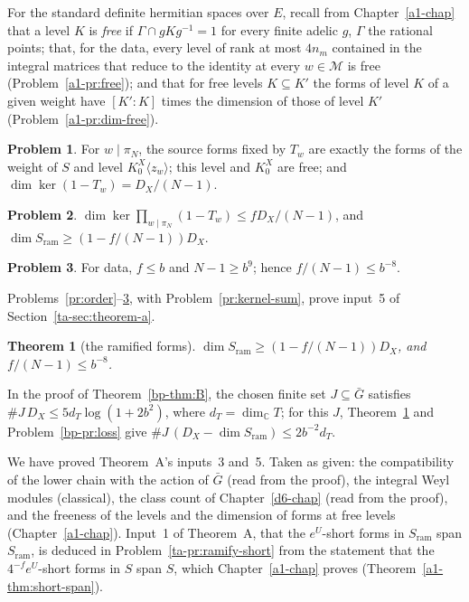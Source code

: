 \documentclass[reqno]{amsart}
\newcounter{chap}
\theoremstyle{definition}
\newtheorem{problem}{Problem}[section]
\theoremstyle{plain}
\newtheorem{theorem}{Theorem}[section]
\theoremstyle{definition}
\newcommand{\C}{\mathbb{C}}
\newcommand{\Gb}{\bar G}
\newcommand{\Sram}{S_{\mathrm{ram}}}
\begin{document}
For the standard definite hermitian spaces over \(E\), recall from Chapter~\ref{a1-chap} that a level \(K\) is \emph{free} if \(\Gamma \cap gKg^{-1} = 1\) for every finite adelic \(g\), \(\Gamma\) the rational points; that, for the data, every level of rank at most \(4n_m\) contained in the integral matrices that reduce to the identity at every \(w \in \mathcal M\) is free (Problem~\ref{a1-pr:free}); and that for free levels \(K \subseteq K'\) the forms of level \(K\) of a given weight have \([K' : K]\) times the dimension of those of level \(K'\) (Problem~\ref{a1-pr:dim-free}).

\begin{problem}\label{pr:fixed-dim}
For \(w \mid \pi_N\), the source forms fixed by \(T_w\) are exactly the forms of the weight of \(S\) and level \(K^X_0\langle z_w\rangle\); this level and \(K^X_0\) are free; and \(\dim\ker(1 - T_w) = D_X/(N - 1)\).
\end{problem}

\begin{problem}\label{pr:ram-dim}
\(\dim\ker\prod_{w \mid \pi_N}(1 - T_w) \le fD_X/(N - 1)\), and \(\dim \Sram \ge (1 - f/(N - 1))D_X\).
\end{problem}

\begin{problem}\label{pr:f-N}
For data, \(f \le b\) and \(N - 1 \ge b^9\); hence \(f/(N - 1) \le b^{-8}\).
\end{problem}

Problems~\ref{pr:order}--\ref{pr:f-N}, with Problem~\ref{pr:kernel-sum}, prove input~5 of Section~\ref{ta-sec:theorem-a}.

\begin{theorem}[the ramified forms]\label{thm:ramified-dim}
\(\dim \Sram \ge (1 - f/(N - 1))D_X\), and \(f/(N - 1) \le b^{-8}\).
\end{theorem}

In the proof of Theorem~\ref{bp-thm:B}, the chosen finite set \(J \subseteq \Gb\) satisfies \(\#J\,D_X \le 5d_T\log(1 + 2b^2)\), where \(d_T = \dim_\C T\); for this \(J\), Theorem~\ref{thm:ramified-dim} and Problem~\ref{bp-pr:loss} give \(\#J\,(D_X - \dim\Sram) \le 2b^{-2}d_T\).

We have proved Theorem~A's inputs~3 and~5.  Taken as given: the compatibility of the lower chain with the action of \(\Gb\) (read from the proof), the integral Weyl modules (classical), the class count of Chapter~\ref{d6-chap} (read from the proof), and the freeness of the levels and the dimension of forms at free levels (Chapter~\ref{a1-chap}).  Input~1 of Theorem~A, that the \(e^U\)-short forms in \(\Sram\) span \(\Sram\), is deduced in Problem~\ref{ta-pr:ramify-short} from the statement that the \(4^{-f}e^U\)-short forms in \(S\) span \(S\), which Chapter~\ref{a1-chap} proves (Theorem~\ref{a1-thm:short-span}).
\end{document}
